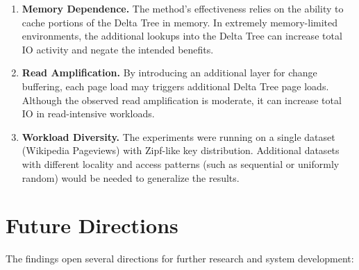 \begin{enumerate}
  \item \textbf{Memory Dependence.}  
  The method's effectiveness relies on the ability to cache portions of the Delta Tree in memory. 
  In extremely memory-limited environments, the additional lookups into the Delta Tree can increase total \ac{IO} activity and negate the intended benefits.
  \item \textbf{Read Amplification.}  
  By introducing an additional layer for change buffering, each page load may triggers additional Delta Tree page loads. 
  Although the observed read amplification is moderate, it can increase total \ac{IO} in read-intensive workloads.
  \item \textbf{Workload Diversity.}  
  The experiments were running on a single dataset (Wikipedia Pageviews) with Zipf-like key distribution.
  Additional datasets with different locality and access patterns (such as sequential or uniformly random) would be needed to generalize the results.
\end{enumerate}

\section{Future Directions}
The findings open several directions for further research and system development:

